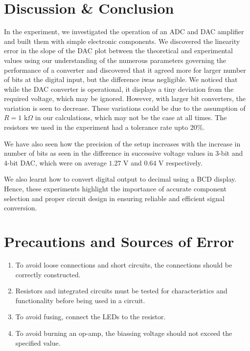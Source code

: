 \section{Discussion \& Conclusion}
In the experiment, we investigated the operation of an ADC and DAC amplifier and built them with simple electronic components. We discovered the linearity error in the slope of the DAC plot between the theoretical and experimental values using our understanding of the numerous parameters governing the performance of a converter and discovered that it agreed more for larger number of bits at the digital input, but the difference iwas negligible. We noticed that while the DAC converter is operational, it displays a tiny deviation from the required voltage, which may be ignored. However, with larger bit converters, the variation is seen to decrease. These variations could be due to the assumption of $R=1$ k$\Omega$ in our calculations, which may not be the case at all times. The resistors we used in the experiment had a tolerance rate upto 20\%.

We have also seen how the precision of the setup increases with the increase in number of bits as seen in the difference in successive voltage values in 3-bit and 4-bit DAC, which were on average $1.27$ V and $0.64$ V respectively. 

We also learnt how to convert digital output to decimal using a BCD display. 
Hence, these experiments highlight the importance of accurate component selection and proper circuit design in ensuring reliable and efficient signal conversion.

\section{Precautions and Sources of Error}

    \begin{enumerate}
        \item To avoid loose connections and short circuits, the
        connections should be correctly constructed.
        \item Resistors and integrated circuits must be tested for characteristics and functionality before being used
        in a circuit.
        \item To avoid fusing, connect the LEDs to the resistor.
        \item To avoid burning an op-amp, the biassing voltage
        should not exceed the specified value.
    \end{enumerate}

